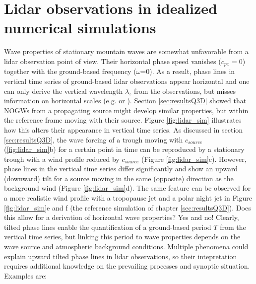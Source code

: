 \section{Lidar observations in idealized numerical simulations}
\label{sec:lidOb-idealized}


Wave properties of stationary mountain waves are somewhat unfavorable from a lidar observation point of view. Their horizontal phase speed vanishes ($c_{px}=0$) together with the ground-based frequency ($\omega$=0). As a result, phase lines in vertical time series of ground-based lidar observations appear horizontal and one can only derive the vertical wavelength $\lambda_z$ from the observations, but misses information on horizontal scales (e.g. \cite[]{dornbrack_interpretation_2017} or \cite[]{reichert_highcadence_2021}). Section \ref{sec:resultsQ3D} showed that NOGWs from a propagating source might develop similar properties, but within the reference frame moving with their source. Figure \ref{fig:lidar_sim} illustrates how this alters their appearance in vertical time series. As discussed in section \ref{sec:resultsQ3D}, the wave forcing of a trough moving with $c_{source}$ (\ref{fig:lidar_sim}b) for a certain point in time can be reproduced by a stationary trough with a wind profile reduced by $c_{source}$ (Figure \ref{fig:lidar_sim}c). However, phase lines in the vertical time series differ significantly and show an upward (downward) tilt for a source moving in the same (opposite) direction as the background wind (Figure \ref{fig:lidar_sim}d). The same feature can be observed for a more realistic wind profile with a tropopause jet and a polar night jet in Figure \ref{fig:lidar_sim}e and f (the reference simulation of chapter \ref{sec:resultsQ3D}). Does this allow for a derivation of horizontal wave properties? Yes and no! Clearly, tilted phase lines enable the quantification of a ground-based period $T$ from the vertical time series, but linking this period to wave properties depends on the wave source and atmospheric background conditions. Multiple phenomena could explain upward tilted phase lines in lidar observations, so their intepretation requires additional knowledge on the prevailing processes and synoptic situation. Examples are:


